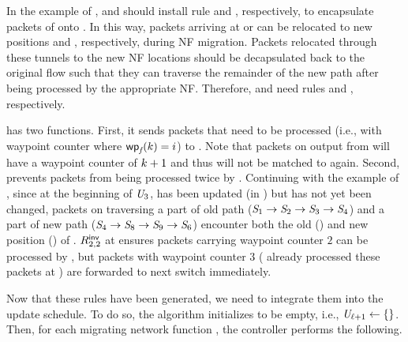 In the example of ,  and
 should install rule  and ,
respectively, to encapsulate packets of \flowID{} onto
\flowIDTunnel{\nfIdx}.  In this way, packets arriving at 
or  can be relocated to new positions  and
, respectively, during NF migration. Packets relocated
through these tunnels to the new NF locations should be decapsulated
back to the original flow \flowID{} such that they can traverse the
remainder of the new path after being processed by the appropriate
NF. Therefore,  and  need rules 
and , respectively.

 has two functions. First, it sends packets
that need to be processed (i.e., with waypoint counter \wpIdx where
$\wpFn{\flowID{}}(\wpIdx) = \nfIdx$) to \nfID{\nfIdx}.  Note that
packets on \flowID{} output from \nfID{\nfIdx} will have a waypoint
counter of $k+1$ and thus will not be matched to
 again.  Second, 
prevents packets from being processed twice by \nfID{\nfIdx}.
Continuing with the example of , since at
the beginning of $\mathit{U}_{3}$,  has been updated (in
) but  has not yet been changed, packets on
\flowID{} traversing a part of old path ($\switchID{1} \rightarrow
\switchID{2} \rightarrow \switchID{3} \rightarrow \switchID{4}$) and a
part of new path ($\switchID{4} \rightarrow \switchID{8} \rightarrow
\switchID{9} \rightarrow \switchID{6}$) encounter both the old
() and new position () of .
$\ruleIDInv{2}{2}$ at  ensures packets carrying waypoint
counter $2$ can be processed by , but packets with waypoint
counter $3$ ( already processed these packets at )
are forwarded to next switch  immediately.

Now that these rules have been generated, we need to integrate them
into the update schedule.  To do so, the algorithm initializes
 to be empty, i.e.,
$\mathit{U}_{\mathit{\ell}+1} \gets \{\}$.  Then, for each migrating
network function \nfID{\nfIdx}, the controller performs the following.

